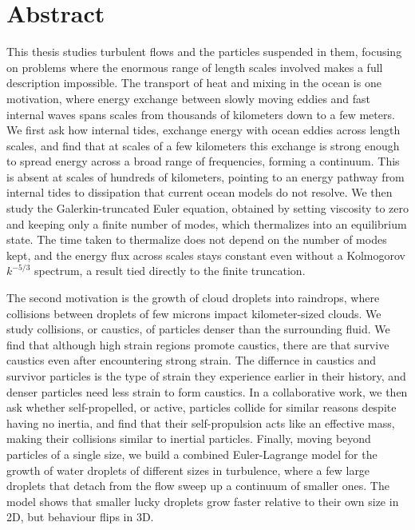 \documentclass[11pt,a4paper,twoside]{book}
\begin{document}
\frontmatter


\begingroup
\renewcommand{\chaptermark}[1]{}
\chapter*{Abstract}
This thesis studies turbulent flows and the particles suspended in them, focusing on problems where the enormous range of length scales involved makes a full description impossible. The transport of heat and mixing in the ocean is one motivation, where energy exchange between slowly moving eddies and fast internal waves spans scales from thousands of kilometers down to a few meters. We first ask how internal tides, exchange energy with ocean eddies across length scales, and find that at scales of a few kilometers this exchange is strong enough to spread energy across a broad range of frequencies, forming a continuum. This is absent at scales of hundreds of kilometers, pointing to an energy pathway from internal tides to dissipation that current ocean models do not resolve. We then study the Galerkin-truncated Euler equation, obtained by setting viscosity to zero and keeping only a finite number of modes, which thermalizes into an equilibrium state. The time taken to thermalize does not depend on the number of modes kept, and the energy flux across scales stays constant even without a Kolmogorov $k^{-5/3}$ spectrum, a result tied directly to the finite truncation.

The second motivation is the growth of cloud droplets into raindrops, where collisions between droplets of few microns impact kilometer-sized clouds. We study collisions, or caustics, of particles denser than the surrounding fluid. We find that although high strain regions promote caustics, there are that survive caustics even after encountering strong strain. The differnce in caustics and survivor particles is the type of strain they experience earlier in their history, and denser particles need less strain to form caustics. In a collaborative work, we then ask whether self-propelled, or active, particles collide for similar reasons despite having no inertia, and find that their self-propulsion acts like an effective mass, making their collisions similar to inertial particles. Finally, moving beyond particles of a single size, we build a combined Euler-Lagrange model for the growth of water droplets of different sizes in turbulence, where a few large droplets that detach from the flow sweep up a continuum of smaller ones. The model shows that smaller lucky droplets grow faster relative to their own size in 2D, but behaviour flips in 3D.
\end{document}
